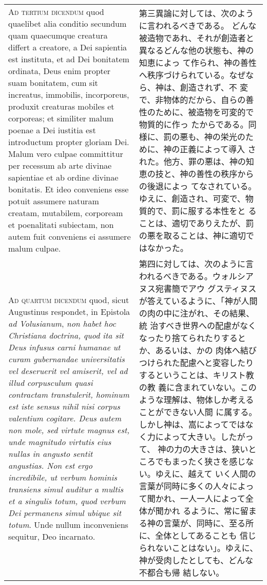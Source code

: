 \documentclass[10pt]{jsarticle} %
\begin{document}
\begin{longtable}{p{21em}p{21em}}
{\scshape Ad tertium dicendum} quod quaelibet alia conditio secundum quam
quaecumque creatura differt a creatore, a Dei sapientia est instituta,
et ad Dei bonitatem ordinata, Deus enim propter suam bonitatem, cum sit
increatus, immobilis, incorporeus, produxit creaturas mobiles et
corporeas; et similiter malum poenae a Dei iustitia est introductum
propter gloriam Dei. Malum vero culpae committitur per recessum ab arte
divinae sapientiae et ab ordine divinae bonitatis. Et ideo conveniens
esse potuit assumere naturam creatam, mutabilem, corpoream et
poenalitati subiectam, non autem fuit conveniens ei assumere malum
culpae.

&

第三異論に対しては、次のように言われるべきである。
どんな被造物であれ、それが創造者と異なるどんな他の状態も、神の知恵によっ
 て作られ、神の善性へ秩序づけられている。なぜなら、神は、創造されず、不
 変で、非物体的だから、自らの善性のために、被造物を可変的で物質的に作っ
 たからである。同様に、罰の悪も、神の栄光のために、神の正義によって導入
 された。他方、罪の悪は、神の知恵の技と、神の善性の秩序からの後退によっ
 てなされている。ゆえに、創造され、可変で、物質的で、罰に服する本性をと
 ることは、適切でありえたが、罰の悪を取ることは、神に適切ではなかった。

\\

{\scshape Ad quartum dicendum} quod, sicut Augustinus respondet, in Epistola {\itshape ad
Volusianum}, {\itshape non habet hoc Christiana doctrina, quod ita sit Deus infusus
carni humanae ut curam gubernandae universitatis vel deseruerit vel
amiserit, vel ad illud corpusculum quasi contractam transtulerit,
hominum est iste sensus nihil nisi corpus valentium cogitare. Deus autem
non mole, sed virtute magnus est, unde magnitudo virtutis eius nullas in
angusto sentit angustias. Non est ergo incredibile, ut verbum hominis
transiens simul auditur a multis et a singulis totum, quod verbum Dei
permanens simul ubique sit totum}. Unde nullum inconveniens sequitur, Deo
incarnato.
&

第四に対しては、次のように言われるべきである。ウォルシアヌス宛書簡でアウ
 グスティヌスが答えているように、「神が人間の肉の中に注がれ、その結果、統
 治すべき世界への配慮がなくなったり捨てられたりするとか、あるいは、かの
 肉体へ結びつけられた配慮へと変容したりするということは、キリスト教の教
 義に含まれていない。このような理解は、物体しか考えることができない人間
 に属する。しかし神は、嵩によってではなく力によって大きい。したがって、
 神の力の大きさは、狭いところでもまったく狭さを感じない。ゆえに、越えて
 いく人間の言葉が同時に多くの人々によって聞かれ、一人一人によって全体が聞かれ
 るように、常に留まる神の言葉が、同時に、至る所に、全体としてあることも
 信じられないことはない」。ゆえに、神が受肉したとしても、どんな不都合も帰
 結しない。
\end{longtable}
\end{document}
